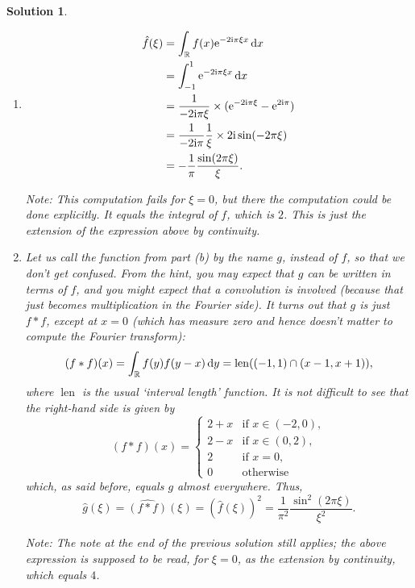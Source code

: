 \documentclass{article}
\theoremstyle{nonumberplain}
\newtheorem{sol}{Solution}
\newcommand{\R}{\mathbb{R}}
\newcommand{\e}{\mathrm{e}}
\newcommand{\I}{\mathrm{i}}
\DeclareMathOperator{\len}{len}
\begin{document}
\begin{sol}
\leavevmode
\begin{enumerate}
\item
\begin{equation}
\begin{aligned}
\hat f(\xi)
&= \int_\R f(x) \e^{- 2 \I \pi \xi x} \dl x\\
&= \int_{-1}^1 \e^{- 2 \I \pi \xi x} \dl x\\
&= \frac1{-2\I\pi \xi} \times (\e^{-2\I\pi \xi} - \e^{2\I\pi})\\
&= \frac1{-2\I\pi} \frac1\xi \times 2\I \sin(-2\pi\xi)\\
&= - \frac1\pi \frac{\sin(2\pi\xi)}\xi.
\end{aligned}
\end{equation}

Note: This computation fails for $\xi = 0$, but there the computation could be done explicitly. It equals the integral of $f$, which is $2$. This is just the extension of the expression above by continuity.

\item Let us call the function from part (b) by the name $g$, instead of $f$, so that we don't get confused. From the hint, you may expect that $g$ can be written in terms of $f$, and you might expect that a convolution is involved (because that just becomes multiplication in the Fourier side). It turns out that $g$ is just $f * f$, except at $x=0$ (which has measure zero and hence doesn't matter to compute the Fourier transform):
\begin{equation}
(f*f)(x) = \int_\R f(y) f(y-x) \dl y = \len((-1,1) \cap (x-1, x+1)),
\end{equation}
where $\len$ is the usual `interval length' function. It is not difficult to see that the right-hand side is given by
\begin{equation}
(f*f)(x) = \begin{cases}
2+x & \text{if $x \in (-2,0)$},\\
2-x & \text{if $x \in (0,2)$},\\
2 & \text{if $x = 0$},\\
0 & \text{otherwise}
\end{cases}
\end{equation}
which, as said before, equals $g$ almost everywhere. Thus,
\begin{equation}
\hat g(\xi) = \widehat{(f*f)}(\xi) = (\hat f(\xi))^2 = \frac1{\pi^2} \frac{\sin^2(2\pi\xi)}{\xi^2}.
\end{equation}

Note: The note at the end of the previous solution still applies; the above expression is supposed to be read, for $\xi = 0$, as the extension by continuity, which equals $4$.
\end{enumerate}
\end{sol}
\end{document}
